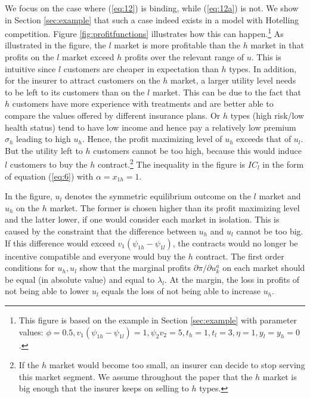 \documentclass[12pt,english,a4paper]{article}
\begin{document}
We focus on the case where (\ref{eq:12}) is binding, while (\ref{eq:12a}) is not. We show in Section \ref{sec:example} that such a case indeed exists in a model with Hotelling competition. Figure \ref{fig:profitfunctions} illustrates how this can happen.\footnote{This figure is based on the example in Section \ref{sec:example} with parameter values: \(\phi=0.5,v_1(\psi_{1h}-\psi_{1l})=1,\psi_2v_2=5,t_h=1,t_l=3,\eta =1,y_l=y_h=0\).} As illustrated in the figure, the \(l\) market is more profitable than the \(h\) market in that profits on the \(l\) market exceed \(h\) profits over the relevant range of \(u\). This is intuitive since \(l\) customers are cheaper in expectation than \(h\) types. In addition, for the insurer to attract customers on the \(h\) market, a larger utility level needs to be left to its customers than on the \(l\) market. This can be due to the fact that \(h\) customers have more experience with treatments and are better able to compare the values offered by different insurance plans. Or \(h\) types (high risk/low health status) tend to have low income and hence pay a relatively low premium \(\sigma_h\) leading to high \(u_h\). Hence, the profit maximizing level of \(u_h\) exceeds that of \(u_l\). But the utility left to \(h\) customers cannot be too high, because this would induce \(l\) customers to buy the \(h\) contract.\footnote{If the \(h\) market would become too small, an insurer can decide to stop serving this market segment. We assume throughout the paper that the \(h\) market is big enough that the insurer keeps on selling to \(h\) types.} The inequality in the figure is \(IC_l\) in the form of equation (\ref{eq:6}) with \(\alpha=x_{1h}=1\).

In the figure, \(u_l\) denotes the symmetric equilibrium outcome on the \(l\) market and \(u_h\) on the \(h\) market. The former is chosen higher than its profit maximizing level and the latter lower, if one would consider each market in isolation. This is caused by the constraint that the difference between \(u_h\) and \(u_l\) cannot be too big. If this difference would exceed \(v_1 (\psi_{1h}-\psi_{1l})\), the contracts would no longer be incentive compatible and everyone would buy the \(h\) contract. The first order conditions for \(u_h,u_l\) show that the marginal profits \(\partial \pi/\partial u_k^a\) on each market should be equal (in absolute value) and equal to \(\lambda_l\). At the margin, the loss in profits of not being able to lower \(u_l\) equals the loss of not being able to increase \(u_h\).
\end{document}
